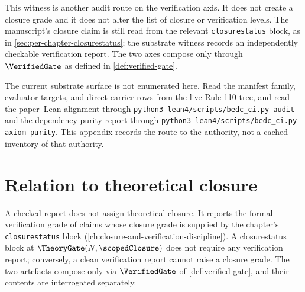 This witness is another audit route on the verification axis. It does not create a closure grade and it does not alter the list of closure or verification levels. The manuscript's closure claim is still read from the relevant \texttt{closurestatus} block, as in \autoref{sec:per-chapter-closurestatus}; the substrate witness records an independently checkable verification report. The two axes compose only through $\VerifiedGate$ as defined in \autoref{def:verified-gate}.

The current substrate surface is not enumerated here. Read the manifest family, evaluator targets, and direct-carrier rows from the live Rule 110 tree, and read the paper--Lean alignment through \texttt{python3 lean4/scripts/bedc\_ci.py audit} and the dependency purity report through \texttt{python3 lean4/scripts/bedc\_ci.py axiom-purity}. This appendix records the route to the authority, not a cached inventory of that authority.

\section{Relation to theoretical closure}
\label{sec:appendix-relation-to-closure}

A checked report does not assign theoretical closure. It reports the formal verification grade of claims whose closure grade is supplied by the chapter's \texttt{closurestatus} block (\autoref{ch:closure-and-verification-discipline}). A closurestatus block at $\TheoryGate(N, \scopedClosure)$ does not require any verification report; conversely, a clean verification report cannot raise a closure grade. The two artefacts compose only via $\VerifiedGate$ of \autoref{def:verified-gate}, and their contents are interrogated separately.
